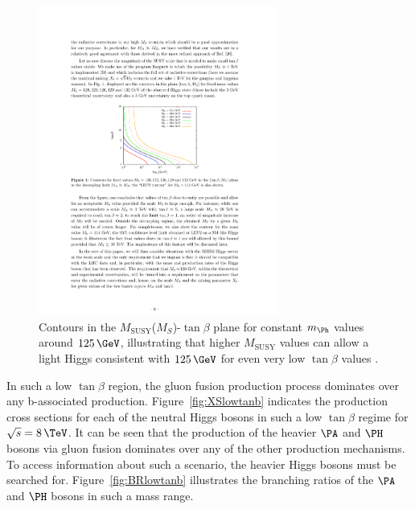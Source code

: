 \begin{figure}[htbp]
   \includegraphics[width=0.7\textwidth]{plots/theory/MSUSY_tanb.pdf}
\caption[Contours in the $M_{\text{SUSY}}$-$\tan\beta$ plane for
constant $m_{\Ph}$ values around $125\,\GeV$.]{Contours in the $M_{\text{SUSY}}$($M_{S}$)-$\tan\beta$ plane for
constant $m_{\Ph}$ values around $125\,\GeV$, illustrating that higher
$M_{\text{SUSY}}$ values can allow a light Higgs consistent with $125\,\GeV$ for
even very low $\tan\beta$ values \cite{Djouadi:2013vqa}.}
\label{fig:MSUSYcontours}
\end{figure}

In such a low $\tan\beta$ region, the gluon fusion production process dominates
over any b-associated production. Figure~\ref{fig:XSlowtanb} indicates the
production cross sections for each of the neutral Higgs bosons in such a low
$\tan\beta$ regime for $\sqrt{s}=8\,\TeV$. It can be seen that the production of
the heavier $\PA$ and $\PH$ bosons via gluon fusion dominates over any of the
other production mechanisms. To access information about such a scenario,
the heavier Higgs bosons must be searched for.
Figure~\ref{fig:BRlowtanb} illustrates the branching ratios of the $\PA$ and
$\PH$ bosons in such a mass range. 

